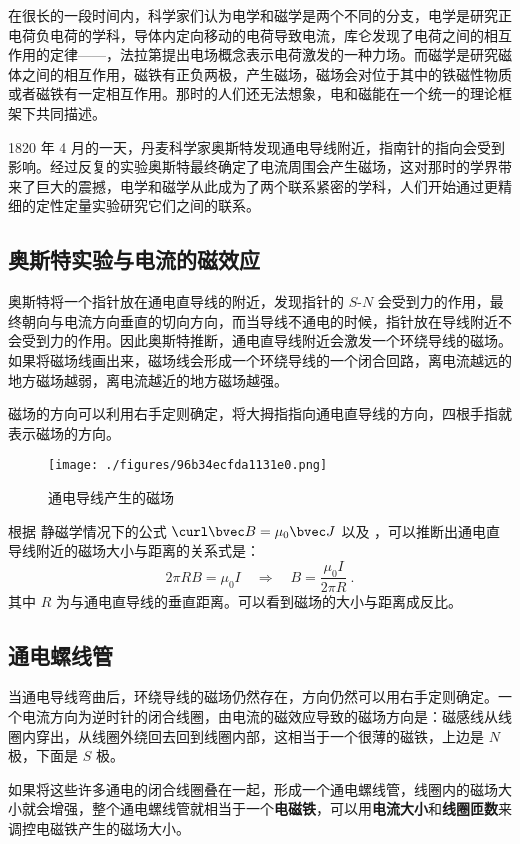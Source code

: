 

在很长的一段时间内，科学家们认为电学和磁学是两个不同的分支，电学是研究正电荷负电荷的学科，导体内定向移动的电荷导致电流，库仑发现了电荷之间的相互作用的定律——，法拉第提出电场概念表示电荷激发的一种力场。而磁学是研究磁体之间的相互作用，磁铁有正负两极，产生磁场，磁场会对位于其中的铁磁性物质或者磁铁有一定相互作用。那时的人们还无法想象，电和磁能在一个统一的理论框架下共同描述。

1820 年 4 月的一天，丹麦科学家奥斯特发现通电导线附近，指南针的指向会受到影响。经过反复的实验奥斯特最终确定了电流周围会产生磁场，这对那时的学界带来了巨大的震撼，电学和磁学从此成为了两个联系紧密的学科，人们开始通过更精细的定性定量实验研究它们之间的联系。
\subsection{奥斯特实验与电流的磁效应}
奥斯特将一个指针放在通电直导线的附近，发现指针的 $S$-$N$ 会受到力的作用，最终朝向与电流方向垂直的切向方向，而当导线不通电的时候，指针放在导线附近不会受到力的作用。因此奥斯特推断，通电直导线附近会激发一个环绕导线的磁场。如果将磁场线画出来，磁场线会形成一个环绕导线的一个闭合回路，离电流越远的地方磁场越弱，离电流越近的地方磁场越强。

磁场的方向可以利用右手定则确定，将大拇指指向通电直导线的方向，四根手指就表示磁场的方向。

\begin{figure}[ht]
\centering
\texttt{[image: ./figures/96b34ecfda1131e0.png]}
\caption{通电导线产生的磁场} \label{fig_CurMag_1}
\end{figure}

根据 静磁学情况下的公式 $\curl \bvec B=\mu_0 \bvec J$ 以及 ，可以推断出通电直导线附近的磁场大小与距离的关系式是：
\begin{equation}
2\pi R B = \mu_0 I\quad \Rightarrow\quad B=\frac{\mu_0 I }{2\pi R}~.
\end{equation}
其中 $R$ 为与通电直导线的垂直距离。可以看到磁场的大小与距离成反比。
\subsection{通电螺线管}
当通电导线弯曲后，环绕导线的磁场仍然存在，方向仍然可以用右手定则确定。一个电流方向为逆时针的闭合线圈，由电流的磁效应导致的磁场方向是：磁感线从线圈内穿出，从线圈外绕回去回到线圈内部，这相当于一个很薄的磁铁，上边是 $N$ 极，下面是 $S$ 极。

如果将这些许多通电的闭合线圈叠在一起，形成一个通电螺线管，线圈内的磁场大小就会增强，整个通电螺线管就相当于一个\textbf{电磁铁}，可以用\textbf{电流大小}和\textbf{线圈匝数}来调控电磁铁产生的磁场大小。
